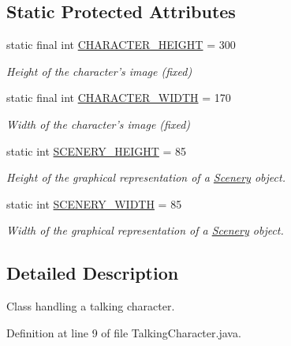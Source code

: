 \subsection*{Static Protected Attributes}
\begin{DoxyCompactItemize}
\item 
static final int \hyperlink{a00005_a31596c03022d61aeb8aac56f149309be}{C\-H\-A\-R\-A\-C\-T\-E\-R\-\_\-\-H\-E\-I\-G\-H\-T} = 300
\begin{DoxyCompactList}\small\item\em Height of the character's image (fixed) \end{DoxyCompactList}\item 
static final int \hyperlink{a00005_a2a46ba03b3e10896b7757f891336e8b8}{C\-H\-A\-R\-A\-C\-T\-E\-R\-\_\-\-W\-I\-D\-T\-H} = 170
\begin{DoxyCompactList}\small\item\em Width of the character's image (fixed) \end{DoxyCompactList}\item 
static int \hyperlink{a00024_a106e53ae6e1647395740237ccce7f363}{S\-C\-E\-N\-E\-R\-Y\-\_\-\-H\-E\-I\-G\-H\-T} = 85
\begin{DoxyCompactList}\small\item\em Height of the graphical representation of a \hyperlink{a00024}{Scenery} object. \end{DoxyCompactList}\item 
static int \hyperlink{a00024_affb047c028883c6d069a03ef0f1caeb8}{S\-C\-E\-N\-E\-R\-Y\-\_\-\-W\-I\-D\-T\-H} = 85
\begin{DoxyCompactList}\small\item\em Width of the graphical representation of a \hyperlink{a00024}{Scenery} object. \end{DoxyCompactList}\end{DoxyCompactItemize}


\subsection{Detailed Description}
Class handling a talking character. 

Definition at line 9 of file Talking\-Character.\-java.



